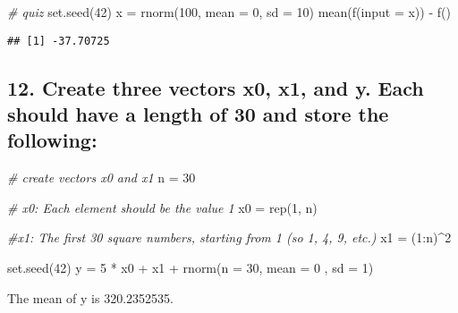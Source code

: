 \documentclass[
]{article}
\newenvironment{Shaded}{\begin{snugshade}}{\end{snugshade}}
\newcommand{\AttributeTok}[1]{\textcolor[rgb]{0.77,0.63,0.00}{#1}}
\newcommand{\CommentTok}[1]{\textcolor[rgb]{0.56,0.35,0.01}{\textit{#1}}}
\newcommand{\DecValTok}[1]{\textcolor[rgb]{0.00,0.00,0.81}{#1}}
\newcommand{\FunctionTok}[1]{\textcolor[rgb]{0.00,0.00,0.00}{#1}}
\newcommand{\NormalTok}[1]{#1}
\newcommand{\OtherTok}[1]{\textcolor[rgb]{0.56,0.35,0.01}{#1}}
\newcommand{\SpecialCharTok}[1]{\textcolor[rgb]{0.00,0.00,0.00}{#1}}
\begin{document}
\begin{Shaded}
\begin{Highlighting}[]
\CommentTok{\# quiz}
\FunctionTok{set.seed}\NormalTok{(}\DecValTok{42}\NormalTok{)}
\NormalTok{x }\OtherTok{=} \FunctionTok{rnorm}\NormalTok{(}\DecValTok{100}\NormalTok{, }\AttributeTok{mean =} \DecValTok{0}\NormalTok{, }\AttributeTok{sd =} \DecValTok{10}\NormalTok{)}
\FunctionTok{mean}\NormalTok{(}\FunctionTok{f}\NormalTok{(}\AttributeTok{input =}\NormalTok{ x)) }\SpecialCharTok{{-}} \FunctionTok{f}\NormalTok{()}
\end{Highlighting}
\end{Shaded}

\begin{verbatim}
## [1] -37.70725
\end{verbatim}

\hypertarget{create-three-vectors-x0-x1-and-y.-each-should-have-a-length-of-30-and-store-the-following}{%
\subsection{12. Create three vectors x0, x1, and y. Each should have a
length of 30 and store the
following:}\label{create-three-vectors-x0-x1-and-y.-each-should-have-a-length-of-30-and-store-the-following}}

\begin{Shaded}
\begin{Highlighting}[]
\CommentTok{\# create vectors x0 and x1}
\NormalTok{n }\OtherTok{=} \DecValTok{30}

\CommentTok{\# x0: Each element should be the value 1 }
\NormalTok{x0 }\OtherTok{=} \FunctionTok{rep}\NormalTok{(}\DecValTok{1}\NormalTok{, n)}

\CommentTok{\#x1: The first 30 square numbers, starting from 1 (so 1, 4, 9, etc.) }
\NormalTok{x1 }\OtherTok{=}\NormalTok{ (}\DecValTok{1}\SpecialCharTok{:}\NormalTok{n)}\SpecialCharTok{\^{}}\DecValTok{2}

\FunctionTok{set.seed}\NormalTok{(}\DecValTok{42}\NormalTok{)}
\NormalTok{y  }\OtherTok{=} \DecValTok{5} \SpecialCharTok{*}\NormalTok{ x0 }\SpecialCharTok{+}\NormalTok{ x1 }\SpecialCharTok{+} \FunctionTok{rnorm}\NormalTok{(}\AttributeTok{n =} \DecValTok{30}\NormalTok{, }\AttributeTok{mean =} \DecValTok{0}\NormalTok{ , }\AttributeTok{sd =} \DecValTok{1}\NormalTok{)}
\end{Highlighting}
\end{Shaded}

The mean of y is 320.2352535.
\end{document}
